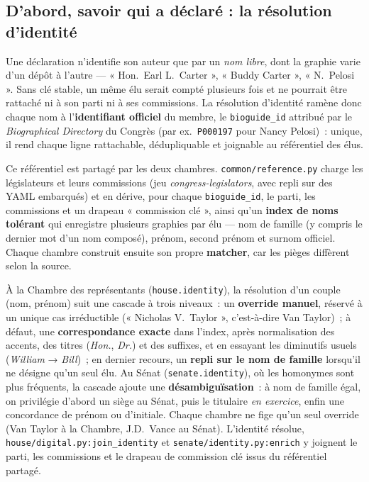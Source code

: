 \documentclass[11pt,a4paper]{article}
\newcommand{\co}[1]{\texttt{\small #1}}
\begin{document}
\subsection{D'abord, savoir qui a déclaré : la résolution d'identité}
\label{sec:identity}
Une déclaration n'identifie son auteur que par un \emph{nom libre}, dont la graphie varie d'un dépôt à
l'autre — « Hon.~Earl L.~Carter », « Buddy Carter », « N.~Pelosi ». Sans clé stable, un même élu serait
compté plusieurs fois et ne pourrait être rattaché ni à son parti ni à ses commissions. La résolution
d'identité ramène donc chaque nom à l'\textbf{identifiant officiel} du membre, le \co{bioguide_id} attribué
par le \emph{Biographical Directory} du Congrès (par ex.~\co{P000197} pour Nancy Pelosi)~: unique, il rend
chaque ligne rattachable, dédupliquable et joignable au référentiel des élus.

Ce référentiel est partagé par les deux chambres. \co{common/reference.py} charge les législateurs et leurs
commissions (jeu \emph{congress-legislators}, avec repli sur des YAML embarqués) et en dérive, pour chaque
\co{bioguide_id}, le parti, les commissions et un drapeau « commission clé », ainsi qu'un \textbf{index de
noms tolérant} qui enregistre plusieurs graphies par élu — nom de famille (y compris le dernier mot d'un nom
composé), prénom, second prénom et surnom officiel. Chaque chambre construit ensuite son propre
\textbf{matcher}, car les pièges diffèrent selon la source.

À la Chambre des représentants (\co{house.identity}), la résolution d'un couple (nom, prénom) suit une
cascade à trois niveaux~: un \textbf{override manuel}, réservé à un unique cas irréductible
(« Nicholas V.~Taylor », c'est-à-dire Van Taylor)~; à défaut, une \textbf{correspondance exacte} dans
l'index, après normalisation des accents, des titres (\emph{Hon.}, \emph{Dr.}) et des suffixes, et en
essayant les diminutifs usuels (\emph{William} → \emph{Bill})~; en dernier recours, un \textbf{repli sur le
nom de famille} lorsqu'il ne désigne qu'un seul élu. Au Sénat (\co{senate.identity}), où les homonymes sont
plus fréquents, la cascade ajoute une \textbf{désambiguïsation}~: à nom de famille égal, on privilégie
d'abord un siège au Sénat, puis le titulaire \emph{en exercice}, enfin une concordance de prénom ou
d'initiale. Chaque chambre ne fige qu'un seul override (Van Taylor à la Chambre, J.D.~Vance au Sénat).
L'identité résolue, \co{house/digital.py:join_identity} et \co{senate/identity.py:enrich} y joignent le
parti, les commissions et le drapeau de commission clé issus du référentiel partagé.
\end{document}
